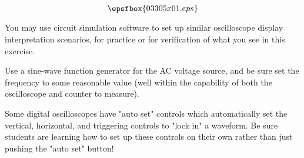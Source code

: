 

$$\epsfbox{03305x01.eps}$$

\vfil \eject






You may use circuit simulation software to set up similar oscilloscope display interpretation scenarios, for practice or for verification of what you see in this exercise.







Use a sine-wave function generator for the AC voltage source, and be sure set the frequency to some reasonable value (well within the capability of both the oscilloscope and counter to measure).

Some digital oscilloscopes have "auto set" controls which automatically set the vertical, horizontal, and triggering controls to "lock in" a waveform.  Be sure students are learning how to set up these controls on their own rather than just pushing the "auto set" button!




